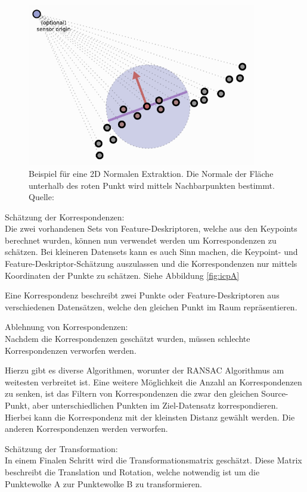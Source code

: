 \begin{figure}[H]
    \centering
    \includegraphics[width=10cm]{graphics/normals.png}
    \caption{Beispiel für eine 2D Normalen Extraktion. 
             Die Normale der Fläche unterhalb des roten Punkt wird mittels Nachbarpunkten bestimmt.
             Quelle: \cite{normals2024}}
    \label{fig:normals}
\end{figure}

Schätzung der Korrespondenzen: \\
Die zwei vorhandenen Sets von Feature-Deskriptoren, welche aus den Keypoints berechnet wurden, 
können nun verwendet werden um Korrespondenzen zu schätzen.
Bei kleineren Datensets kann es auch Sinn machen, die Keypoint- und Feature-Deskriptor-Schätzung auszulassen
und die Korrespondenzen nur mittels Koordinaten der Punkte zu schätzen. Siehe Abbildung \ref{fig:icpA}

Eine Korrespondenz beschreibt zwei Punkte oder Feature-Deskriptoren aus verschiedenen Datensätzen, welche den gleichen Punkt im Raum repräsentieren.
\newline

Ablehnung von Korrespondenzen: \\
Nachdem die Korrespondenzen geschätzt wurden, müssen schlechte Korrespondenzen verworfen werden.

Hierzu gibt es diverse Algorithmen, worunter der RANSAC Algorithmus am weitesten verbreitet ist.
Eine weitere Möglichkeit die Anzahl an Korrespondenzen zu senken, 
ist das Filtern von Korrespondenzen die zwar den gleichen Source-Punkt,
aber unterschiedlichen Punkten im Ziel-Datensatz korrespondieren.
Hierbei kann die Korrespondenz mit der kleinsten Distanz gewählt werden.
Die anderen Korrespondenzen werden verworfen.
\newline

Schätzung der Transformation: \\
In einem Finalen Schritt wird die Transformationsmatrix geschätzt.
Diese Matrix beschreibt die Translation und Rotation, 
welche notwendig ist um die Punktewolke A zur Punktewolke B zu transformieren.

